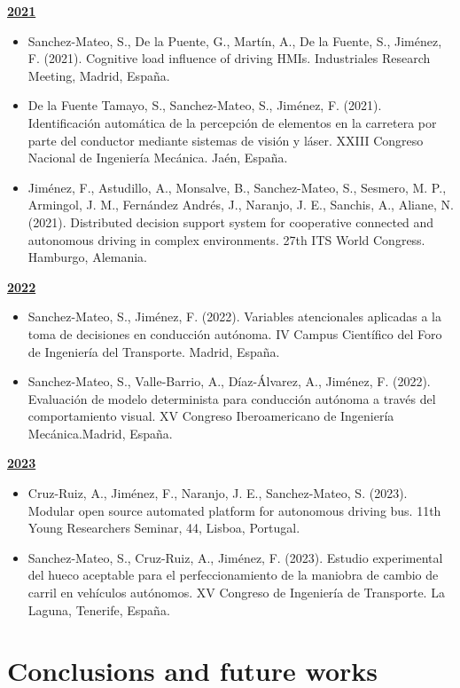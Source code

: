 \textbf{\underline{2021}}
\begin{itemize}
    \item Sanchez-Mateo, S., De la Puente, G., Martín, A., De la Fuente, S., Jiménez, F. (2021). Cognitive load influence of driving HMIs. Industriales Research Meeting, Madrid, España. 
    \item De la Fuente Tamayo, S., Sanchez-Mateo, S., Jiménez, F. (2021). Identificación automática de la percepción de elementos en la carretera por parte del conductor mediante sistemas de visión y láser. XXIII Congreso Nacional de Ingeniería Mecánica. Jaén, España. 
    \item Jiménez, F., Astudillo, A., Monsalve, B., Sanchez-Mateo, S., Sesmero, M. P., Armingol, J. M., Fernández Andrés, J., Naranjo, J. E., Sanchis, A., Aliane, N. (2021). Distributed decision support system for cooperative connected and autonomous driving in complex environments. 27th ITS World Congress. Hamburgo, Alemania.
\end{itemize}

\textbf{\underline{2022}}
\begin{itemize}
    \item Sanchez-Mateo, S., Jiménez, F. (2022). Variables atencionales aplicadas a la toma de decisiones en conducción autónoma. IV Campus Científico del Foro de Ingeniería del Transporte. Madrid, España.
    \item Sanchez-Mateo, S., Valle-Barrio, A., Díaz-Álvarez, A., Jiménez, F. (2022). Evaluación de modelo determinista para conducción autónoma a través del comportamiento visual. XV Congreso Iberoamericano de Ingeniería Mecánica.Madrid, España.
\end{itemize}

\textbf{\underline{2023}}
\begin{itemize}
    \item Cruz-Ruiz, A., Jiménez, F., Naranjo, J. E., Sanchez-Mateo, S. (2023). Modular open source automated platform for autonomous driving bus. 11th Young Researchers Seminar, 44, Lisboa, Portugal.  
    \item Sanchez-Mateo, S., Cruz-Ruiz, A., Jiménez, F. (2023). Estudio experimental del hueco aceptable para el perfeccionamiento de la maniobra de cambio de carril en vehículos autónomos. XV Congreso de Ingeniería de Transporte. La Laguna, Tenerife, España. 
\end{itemize}

\newpage
\section*{Conclusions and future works }

